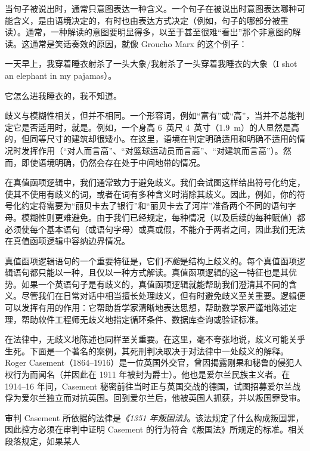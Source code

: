 当句子被说出时，通常只意图表达一种含义。一个句子在被说出时意图表达哪种可能含义，是由语境决定的，有时也由表达方式决定（例如，句子的哪部分被重读）。通常，一种解读的意图要明显得多，以至于甚至很难“看出”那个非意图的解读。这通常是笑话奏效的原因，就像 Groucho Marx 的这个例子：

\begin{compactlist}
	\item[] 一天早上，我穿着睡衣射杀了一头大象/我射杀了一头穿着我睡衣的大象（I shot an elephant in my pajamas）。
	\item[] 它怎么进我睡衣的，我不知道。
\end{compactlist}

歧义与模糊性相关，但并不相同。一个形容词，例如“富有”或“高”，当并不总能判定它是否适用时，就是。例如，一个身高 6~英尺 4~英寸（1.9~m）的人显然是高的，但同等尺寸的建筑却很矮小。在这里，语境在判定明确适用和明确不适用的情况时发挥作用（“对人而言高”、“对篮球运动员而言高”、“对建筑而言高”）。然而，即使语境明确，仍然会存在处于中间地带的情况。

在真值函项逻辑中，我们通常致力于避免歧义。我们会试图这样给出符号化约定，使其不使用有歧义的词，或者在词有多种含义时消除其歧义。因此，例如，你的符号化约定将需要为“丽贝卡去了银行”和“丽贝卡去了河岸”准备两个不同的语句字母。模糊性则更难避免。由于我们已经规定，每种情况（以及后续的每种赋值）都必须使每个基本语句（或语句字母）或真或假，不能介于两者之间，因此我们无法在真值函项逻辑中容纳边界情况。

真值函项逻辑语句的一个重要特征是，它们\emph{不能}是结构上歧义的。每个真值函项逻辑语句都只能以一种，且仅以一种方式解读。真值函项逻辑的这一特征也是其优势。如果一个英语句子是有歧义的，真值函项逻辑就能帮助我们澄清其不同的含义。尽管我们在日常对话中相当擅长处理歧义，但有时避免歧义至关重要。逻辑便可以发挥有用的作用：它帮助哲学家清晰地表达思想，帮助数学家严谨地陈述定理，帮助软件工程师无歧义地指定循环条件、数据库查询或验证标准。

在法律中，无歧义地陈述也同样至关重要。在这里，毫不夸张地说，歧义可能关乎生死。下面是一个著名的案例，其死刑判决取决于对法律中一处歧义的解释。Roger Casement（1864--1916）是一位英国外交官，曾因揭露刚果和秘鲁的侵犯人权行为而闻名（并因此在 1911 年被封为爵士）。他也是爱尔兰民族主义者。在 1914--16 年间，Casement 秘密前往当时正与英国交战的德国，试图招募爱尔兰战俘为爱尔兰独立而对抗英国。回到爱尔兰后，他被英国人抓获，并以叛国罪受审。

审判 Casement 所依据的法律是\textit{《1351 年叛国法》}。该法规定了什么构成叛国罪，因此控方必须在审判中证明 Casement 的行为符合《叛国法》所规定的标准。相关段落规定，如果某人

